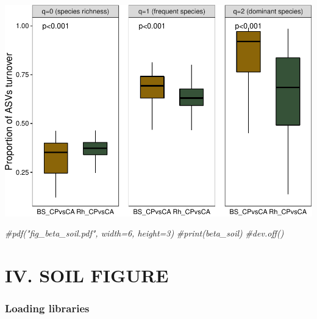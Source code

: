 \documentclass[]{interact}
\theoremstyle{plain}%
\theoremstyle{definition}
\theoremstyle{remark}
\newenvironment{Shaded}{\begin{snugshade}}{\end{snugshade}}
\newcommand{\AttributeTok}[1]{\textcolor[rgb]{0.77,0.63,0.00}{#1}}
\newcommand{\CommentTok}[1]{\textcolor[rgb]{0.56,0.35,0.01}{\textit{#1}}}
\newcommand{\FunctionTok}[1]{\textcolor[rgb]{0.00,0.00,0.00}{#1}}
\newcommand{\NormalTok}[1]{#1}
\newcommand{\SpecialCharTok}[1]{\textcolor[rgb]{0.00,0.00,0.00}{#1}}
\newcommand{\StringTok}[1]{\textcolor[rgb]{0.31,0.60,0.02}{#1}}
\begin{document}
\begin{Shaded}
\end{Shaded}

\includegraphics{Doc_pdf_files/figure-latex/unnamed-chunk-19-1.pdf}

\begin{Shaded}
\begin{Highlighting}[]
\CommentTok{\#pdf("fig\_beta\_soil.pdf", width=6, height=3)}
\CommentTok{\#print(beta\_soil)}
\CommentTok{\#dev.off()}
\end{Highlighting}
\end{Shaded}

\hypertarget{iv.-soil-figure}{%
\section{IV. SOIL FIGURE}\label{iv.-soil-figure}}

\hypertarget{loading-libraries-2}{%
\subsubsection{Loading libraries}\label{loading-libraries-2}}
\end{document}
